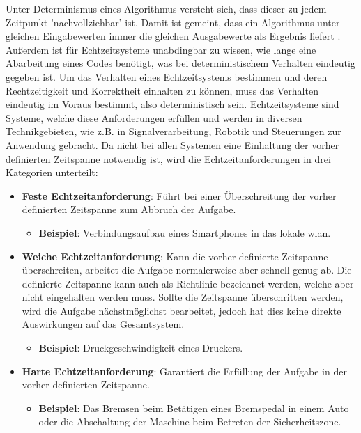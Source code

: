 \documentclass[../EDF Master Thesis.tex]{subfiles}
\begin{document}
Unter Determinismus eines Algorithmus versteht sich, dass dieser zu jedem Zeitpunkt 'nachvollziehbar' ist.
Damit ist gemeint, dass ein Algorithmus unter gleichen Eingabewerten immer die gleichen Ausgabewerte als Ergebnis liefert \autocite{determinismus}.
Außerdem ist für Echtzeitsysteme unabdingbar zu wissen, wie lange eine Abarbeitung eines Codes benötigt, was bei deterministischem Verhalten eindeutig gegeben ist. 
Um das Verhalten eines Echtzeitsystems bestimmen und deren Rechtzeitigkeit und Korrektheit einhalten zu können, muss das Verhalten eindeutig im Voraus bestimmt, also deterministisch sein.
    Echtzeitsysteme sind Systeme, welche diese Anforderungen erfüllen und werden in diversen Technikgebieten, wie z.B. in Signalverarbeitung, Robotik und Steuerungen zur Anwendung gebracht.
    Da nicht bei allen Systemen eine Einhaltung der vorher definierten Zeitspanne notwendig ist, wird die Echtzeitanforderungen in drei Kategorien unterteilt:
    \begin{itemize}
        \item \textbf{Feste Echtzeitanforderung}: Führt bei einer Überschreitung der vorher definierten Zeitspanne zum Abbruch der Aufgabe.
            \begin{itemize}
                \item \textbf{Beispiel}: Verbindungsaufbau eines Smartphones in das lokale \ac{wlan}.
            \end{itemize}
        \item \textbf{Weiche Echtzeitanforderung}: Kann die vorher definierte Zeitspanne überschreiten, arbeitet die Aufgabe normalerweise aber schnell genug ab.
            Die definierte Zeitspanne kann auch als Richtlinie bezeichnet werden, welche aber nicht eingehalten werden muss. 
            Sollte die Zeitspanne überschritten werden, wird die Aufgabe nächstmöglichst bearbeitet, jedoch hat dies keine direkte Auswirkungen auf das Gesamtsystem.
            \begin{itemize}
                \item \textbf{Beispiel}: Druckgeschwindigkeit eines Druckers.
            \end{itemize}
        \item \textbf{Harte Echtzeitanforderung}: Garantiert die Erfüllung der Aufgabe in der vorher definierten Zeitspanne.
        \begin{itemize}
            \item \textbf{Beispiel}: Das Bremsen beim Betätigen eines Bremspedal in einem Auto oder die Abschaltung der Maschine beim Betreten der Sicherheitszone.
        \end{itemize}
    \end{itemize}
\end{document}
